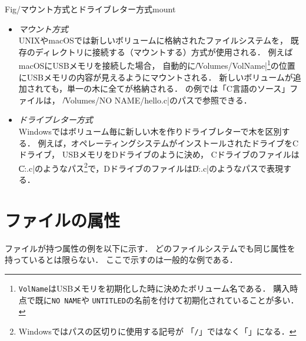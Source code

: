          {Fig/マウント方式とドライブレター方式}{mount}

\begin{itemize}
\item \emph{マウント方式} \\
  UNIXやmacOSでは新しいボリュームに格納されたファイルシステムを，
  既存のディレクトリに接続する（マウントする）方式が使用される．
  例えばmacOSにUSBメモリを接続した場合，
  自動的に\|/Volumes/VolName|\footnote{
    \texttt{VolName}はUSBメモリを初期化した時に決めたボリューム名である．
    購入時点で既に\texttt{NO NAME}や
    \texttt{UNTITLED}の名前を付けて初期化されていることが多い．
  }の位置にUSBメモリの内容が見えるようにマウントされる．
  新しいボリュームが追加されても，単一の木に全てが格納される．
  の例では「C言語のソース」ファイルは，
  \|/Volumes/NO NAME/hello.c|のパスで参照できる．
\item \emph{ドライブレター方式} \\
  Windowsではボリューム毎に新しい木を作りドライブレターで木を区別する．
  例えば，オペレーティングシステムがインストールされたドライブをCドライブ，
  USBメモリをDドライブのように決め，
  Cドライブのファイルは\|C:\Home\hello.c|のようなパス\footnote{
    Windowsではパスの区切りに使用する記号が
    「\texttt{/}」ではなく「\texttt{\bs}」になる．
  }で，Dドライブのファイルは\|D:\hello.c|のようなパスで表現する．
\end{itemize}

\section{ファイルの属性}
\label{fileAttribute}
ファイルが持つ属性の例を以下に示す．
どのファイルシステムでも同じ属性を持っているとは限らない．
ここで示すのは一般的な例である．

